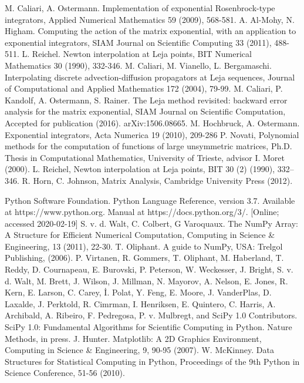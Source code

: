 \documentclass{scrartcl}
\begin{document}
	
	\clearpage
	\begin{thebibliography}{13}
		 M. Caliari, A. Ostermann. Implementation of exponential Rosenbrock-type integrators, Applied Numerical Mathematics 59 (2009), 568-581.
		 A. Al-Mohy, N. Higham. Computing the action of the matrix exponential, with an application to exponential integrators, SIAM Journal on Scientific Computing 33 (2011), 488-511.
		 L. Reichel. Newton interpolation at Leja points, BIT Numerical Mathematics 30 (1990), 332-346.
		 M. Caliari, M. Vianello, L. Bergamaschi. Interpolating discrete advection-diffusion propagators at Leja sequences, Journal of Computational and Applied Mathematics 172 (2004), 79-99.
		 M. Caliari, P. Kandolf, A. Ostermann, S. Rainer. The Leja method revisited: backward error analysis for the matrix exponential, SIAM Journal on Scientific Computation, Accepted for publication (2016). arXiv:1506.08665.
		 M. Hochbruck, A. Ostermann. Exponential integrators, Acta Numerica 19 (2010), 209-286
		 P. Novati, Polynomial methods for the computation of functions of large unsymmetric matrices, Ph.D. Thesis in Computational Mathematics, University of Trieste, advisor I. Moret (2000).
		 L. Reichel, Newton interpolation at Leja points, BIT 30 (2) (1990), 332–346.
		 R. Horn, C. Johnson, Matrix Analysis, Cambridge University Press (2012).
		
		 Python Software Foundation. Python Language Reference, version 3.7. Available at https://www.python.org. Manual at https://docs.python.org/3/. [Online; accessed 2020-02-19]
		 S. v. d. Walt, C. Colbert, G Varoquaux. The NumPy Array: A Structure for Efficient Numerical Computation, Computing in Science \& Engineering, 13 (2011), 22-30.
		 T. Oliphant. A guide to NumPy, USA: Trelgol Publishing, (2006).
		 P. Virtanen, R. Gommers, T. Oliphant, M. Haberland, T. Reddy, D. Cournapeau, E. Burovski, P. Peterson, W. Weckesser, J. Bright, S. v. d. Walt, M. Brett, J. Wilson, J. Millman, N. Mayorov, A. Nelson, E. Jones, R. Kern, E. Larson, C. Carey, İ. Polat, Y. Feng, E. Moore, J. VanderPlas, D. Laxalde, J. Perktold, R. Cimrman, I. Henriksen, E. Quintero, C. Harris, A. Archibald, A. Ribeiro, F. Pedregosa, P. v. Mulbregt, and SciPy 1.0 Contributors. SciPy 1.0: Fundamental Algorithms for Scientific Computing in Python. Nature Methods, in press.
		 J. Hunter. Matplotlib: A 2D Graphics Environment, Computing in Science \& Engineering, 9, 90-95 (2007).
		 W. McKinney. Data Structures for Statistical Computing in Python, Proceedings of the 9th Python in Science Conference, 51-56 (2010).
	\end{thebibliography}
	
\end{document}
